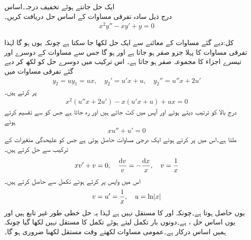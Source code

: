 \quad ایک حل جانتے ہوئے تخفیف درجہ۔اساس\\
درج ذیل سادہ تفرقی مساوات کے اساس حل دریافت کریں۔
\begin{align*}
x^2y''-xy'+y=0
\end{align*}

کل:دیے گئے مساوات کے معائنے سے ایک حل  لکھا جا سکتا ہے چونکہ یوں  ہو گا لہٰذا تفرقی مساوات کا پہلا جزو صفر ہو جاتا ہے  اور  ہو گا جس سے مساوات کے دوسرے اور تیسرے اجزاء کا مجموعہ صفر ہو جاتا ہے۔ اس ترکیب میں دوسرے حل کو  لکھ کر دیے گئے تفرقی مساوات میں
\begin{align*}
y_2=uy_1=ux, \quad y_2'=u'x+u, \quad y_2''=u''x+2u'
\end{align*}
 پر کرتے ہیں۔
\begin{align*}
x^2(u''x+2u')-x(u'x+u)+ux=0
\end{align*}
درج بالا کو ترتیب دیتے ہوئے   اور  آپس میں کٹ جاتے ہیں اور  رہ جاتا ہے جس کو  سے تقسیم کرتے ہوئے
\begin{align*}
xu''+u'=0
\end{align*}
ملتا ہے۔اس میں  پر کرتے ہوئے ایک درجی مساوات حاصل ہوتی ہے جس کو علیحدگی متغیرات کے ترکیب سے حل کرتے ہیں۔
\begin{align*}
xv'+v=0,\quad \frac{\dif v}{v}=-\frac{\dif x}{x}, \quad v=\frac{1}{x}
\end{align*}
اس میں واپس  پر کرتے ہوئے تکمل سے  حاصل کرتے ہیں۔
\begin{align*}
v=u'=\frac{1}{x},\quad u=\ln \abs{x}
\end{align*}
یوں  حاصل ہوتا ہے۔چونکہ  اور   کا  مستقل نہیں ہے لہٰذا یہ حل خطی طور غیر تابع ہیں اور یوں اساس حل ،  ہے۔دونوں بار تکمل لیتے ہوئے تکمل کا مستقل نہیں لکھا گیا چونکہ ہمیں اساس درکار ہے۔عمومی مساوات لکھتے وقت مستقل لکھنا ضروری ہو گا۔

